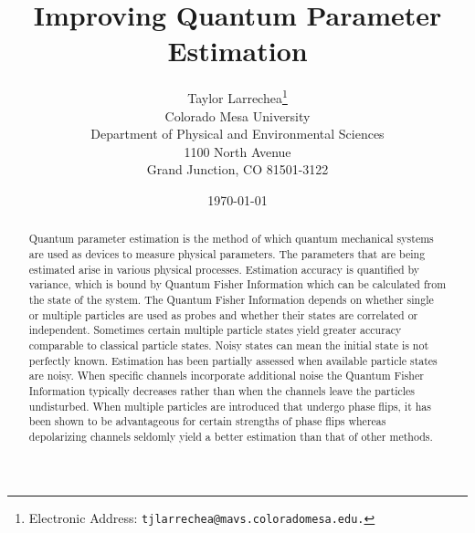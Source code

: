\documentclass[twocolumn]{article}
\title{\textbf{Improving Quantum Parameter Estimation}}
\author{Taylor Larrechea\footnote{Electronic Address: \texttt{tjlarrechea@mavs.coloradomesa.edu.}} \\
    Colorado Mesa University \\
    Department of Physical and Environmental Sciences \\
    1100 North Avenue \\
    Grand Junction, CO 81501-3122}
\date{\today}
\begin{document}
\maketitle
\begin{abstract}
Quantum parameter estimation is the method of which quantum mechanical systems are used as devices to measure physical parameters. The parameters that are being estimated arise in various physical processes. Estimation accuracy is quantified by variance, which is bound by Quantum Fisher Information which can be calculated from the state of the system. The Quantum Fisher Information depends on whether single or multiple particles are used as probes and whether their states are correlated or independent. Sometimes certain multiple particle states yield greater accuracy comparable to classical particle states. Noisy states can mean the initial state is not perfectly known. Estimation has been partially assessed when available particle states are noisy. When specific channels incorporate additional noise the Quantum Fisher Information typically decreases rather than when the channels leave the particles undisturbed. When multiple particles are introduced that undergo phase flips, it has been shown to be advantageous for certain strengths of phase flips whereas depolarizing channels seldomly yield a better estimation than that of other methods.
\end{abstract}
\end{document}
